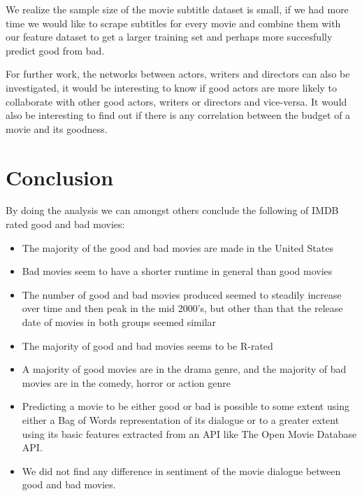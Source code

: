 \documentclass{acm_proc_article-sp}
\begin{document}
We realize the sample size of the movie subtitle dataset is small, if we had more time we would like to scrape subtitles for every movie and combine them with our feature dataset to get a larger training set and perhaps more succesfully predict good from bad.

For further work, the networks between actors, writers and directors can also be investigated, it would be interesting to know if good actors are more likely to collaborate with other good actors, writers or directors and vice-versa.
It would also be interesting to find out if there is any correlation between the budget of a movie and its goodness.

\section{Conclusion}

By doing the analysis we can amongst others conclude the following of IMDB rated good and bad movies:
\begin{itemize}
\item The majority of the good and bad movies are made in the United States
\item Bad movies seem to have a shorter runtime in general than good movies
\item The number of good and bad movies produced seemed to steadily increase over time and then peak in the mid 2000's, but other than that the release date of movies in both groups seemed similar
\item The majority of good and bad movies seems to be R-rated
\item A majority of good movies are in the drama genre, and the majority of bad movies are in the comedy, horror or action genre
\item Predicting a movie to be either good or bad is possible to some extent using either a Bag of Words representation of its dialogue or to a greater extent using its basic features extracted from an API like The Open Movie Database API.
\item We did not find any difference in sentiment of the movie dialogue between good and bad movies.
\end{itemize}
\end{document}
